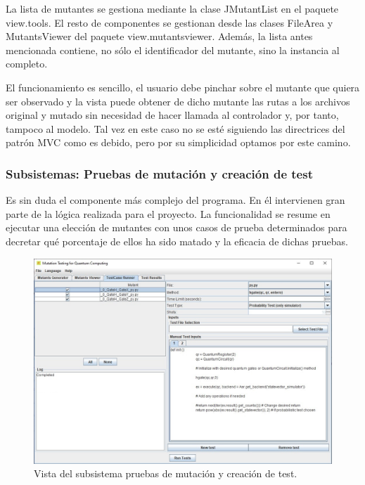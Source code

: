La lista de mutantes se gestiona mediante la clase JMutantList en el paquete view.tools. El resto de componentes se gestionan desde las clases FileArea y MutantsViewer del paquete view.mutantsviewer. Además, la lista antes mencionada contiene, no sólo el identificador del mutante, sino la instancia al completo.

El funcionamiento es sencillo, el usuario debe pinchar sobre el mutante que quiera ser observado y la vista puede obtener de dicho mutante las rutas a los archivos original y mutado sin necesidad de hacer llamada al controlador y, por tanto, tampoco al modelo. Tal vez en este caso no se esté siguiendo las directrices del patrón MVC como es debido, pero por su simplicidad optamos por este camino.

\subsubsection{Subsistemas: Pruebas de mutación y creación de test}

Es sin duda el componente más complejo del programa. En él intervienen gran parte de la lógica realizada para el proyecto. La funcionalidad se resume en ejecutar una elección de mutantes con unos casos de prueba determinados para decretar qué porcentaje de ellos ha sido matado y la eficacia de dichas pruebas.

\begin{figure}[htb]
\begin{center}
\includegraphics[scale=0.45]{images/vista3}
\end{center}
\caption{Vista del subsistema pruebas de mutación y creación de test.}
\label{fig:vista3}
\end{figure}

